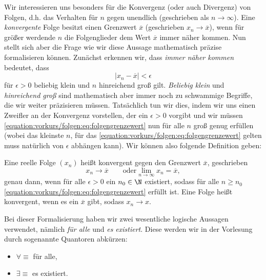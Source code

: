 \documentclass[letterpaper,10pt,english]{jupyterBook}
\begin{document}
Wir interessieren uns besonders für die Konvergenz (oder auch Divergenz) von Folgen, d.h. das Verhalten für \(n\) gegen unendlich (geschrieben als \(n \rightarrow \infty\)). Eine \emph{konvergente} Folge besitzt einen Grenzwert \(\overline{x}\)
(geschrieben \(x_n \rightarrow \overline{x}\)), wenn für größer werdende \(n\) die Folgenglieder dem Wert \(\overline{x}\) immer näher kommen. Nun stellt sich aber die Frage wie wir diese Aussage mathematisch präzise formalisieren können. Zunächst erkennen wir, dass \emph{immer näher kommen}  bedeutet, dass
\begin{equation}\label{equation:vorkurs/folgen:eq:folgengrenzewert}
\vert x_n - \overline{x} \vert < \epsilon
\end{equation}
für \(\epsilon > 0\) beliebig klein und \(n\) hinreichend groß gilt. \emph{Beliebig klein} und  \emph{hinreichend groß} sind mathematisch aber immer noch zu schwammige Begriffe, die wir weiter präzisieren müssen. Tatsächlich tun wir dies, indem wir uns einen Zweifler an der Konvergenz vorstellen, der ein \(\epsilon > 0\) vorgibt und wir müssen \eqref{equation:vorkurs/folgen:eq:folgengrenzewert} nun für alle \(n\) groß genug erfüllen (wobei das kleinste \(n\), für das \eqref{equation:vorkurs/folgen:eq:folgengrenzewert} gelten muss natürlich von \(\epsilon\) abhängen kann). Wir können also folgende Definition geben:
\label{vorkurs/folgen:definition-0}
\begin{definition}{}{}



Eine reelle Folge \((x_n)\) heißt konvergent gegen den Grenzwert \(\overline{x}\), geschrieben
\begin{equation*}
x_n \rightarrow \overline{x} \qquad \text{oder} \lim_{n \rightarrow \infty} x_n = \overline{x},
\end{equation*}
genau dann, wenn für alle \(\epsilon > 0\) ein \(n_0 \in \N\) existiert, sodass für alle \(n \geq n_0\) \eqref{equation:vorkurs/folgen:eq:folgengrenzewert} erfüllt ist.
Eine Folge heißt konvergent, wenn es ein \(\overline{x}\) gibt, sodass \(x_n \rightarrow x\).
\end{definition}

Bei dieser Formalisierung haben wir zwei wesentliche logische Aussagen verwendet, nämlich \emph{für alle} und \emph{es existiert}. Diese werden wir in der Vorlesung durch sogenannte Quantoren abkürzen:
\begin{itemize}
\item {} 
\(\forall \equiv\) für alle,

\item {} 
\(\exists \equiv\) es existiert.

\end{itemize}
\end{document}
